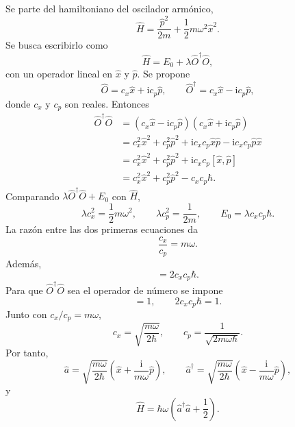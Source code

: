 \documentclass[11pt]{article}
\newcommand{\ii}{\mathrm{i}}
\newcommand{\adag}{\hat a^\dagger}
\begin{document}
Se parte del hamiltoniano del oscilador arm\'onico,
\begin{equation}
  \hat H=\frac{\hat p^2}{2m}+\frac12m\omega^2\hat x^2.
\end{equation}
Se busca escribirlo como
\begin{equation}
  \hat H=E_0+\lambda\hat O^\dagger\hat O,
\end{equation}
con un operador lineal en $\hat x$ y $\hat p$. Se propone
\begin{equation}
  \hat O=c_x\hat x+\ii c_p\hat p,
  \qquad
  \hat O^\dagger=c_x\hat x-\ii c_p\hat p,
\end{equation}
donde $c_x$ y $c_p$ son reales. Entonces
\begin{align}
  \hat O^\dagger\hat O
  &=
  (c_x\hat x-\ii c_p\hat p)(c_x\hat x+\ii c_p\hat p)\\
  &=
  c_x^2\hat x^2+c_p^2\hat p^2
  +\ii c_xc_p\hat x\hat p
  -\ii c_xc_p\hat p\hat x\\
  &=
  c_x^2\hat x^2+c_p^2\hat p^2
  +\ii c_xc_p[\hat x,\hat p]\\
  &=
  c_x^2\hat x^2+c_p^2\hat p^2
  -c_xc_p\hbar.
\end{align}
Comparando $\lambda\hat O^\dagger\hat O+E_0$ con $\hat H$,
\begin{equation}
  \lambda c_x^2=\frac12m\omega^2,
  \qquad
  \lambda c_p^2=\frac{1}{2m},
  \qquad
  E_0=\lambda c_xc_p\hbar.
\end{equation}
La raz\'on entre las dos primeras ecuaciones da
\begin{equation}
  \frac{c_x}{c_p}=m\omega.
\end{equation}
Adem\'as,
\begin{equation}
  [\hat O,\hat O^\dagger]=2c_xc_p\hbar.
\end{equation}
Para que $\hat O^\dagger\hat O$ sea el operador de n\'umero se impone
\begin{equation}
  [\hat O,\hat O^\dagger]=1,
  \qquad
  2c_xc_p\hbar=1.
\end{equation}
Junto con $c_x/c_p=m\omega$,
\begin{equation}
  c_x=\sqrt{\frac{m\omega}{2\hbar}},
  \qquad
  c_p=\frac{1}{\sqrt{2m\omega\hbar}}.
\end{equation}
Por tanto,
\begin{equation}
  \hat a=\sqrt{\frac{m\omega}{2\hbar}}
  \left(\hat x+\frac{\ii}{m\omega}\hat p\right),
  \qquad
  \adag=\sqrt{\frac{m\omega}{2\hbar}}
  \left(\hat x-\frac{\ii}{m\omega}\hat p\right),
\end{equation}
y
\begin{equation}
  \hat H=\hbar\omega\left(\adag\hat a+\frac12\right).
\end{equation}
\end{document}
